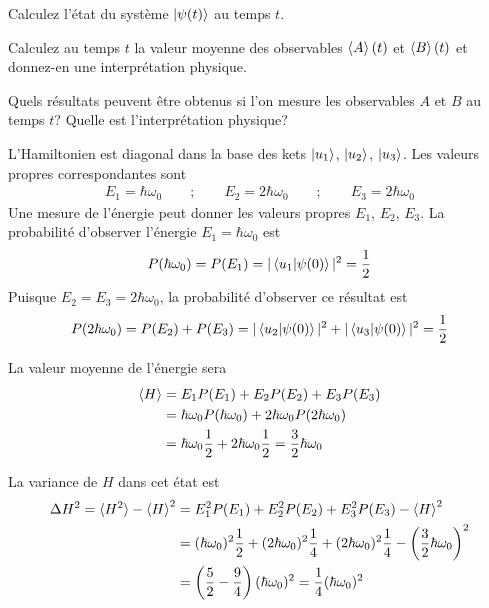 \documentclass[12pt,solution=false]{uqtrassignment}
\begin{document}
\begin{problem}{}
\subproblem
Calculez l'état du système $\ket{\psi(t)}$ au temps $t$.

\subproblem
Calculez au temps $t$ la valeur moyenne des observables
  $\braket{A}(t)$ et $\braket{B}(t)$
  et donnez-en une interprétation physique.



\subproblem
Quels résultats peuvent être obtenus si l'on mesure les observables
  $A$ et $B$ au temps $t$?
Quelle est l'interprétation physique?


\begin{solution}

\subproblem
L'Hamiltonien est diagonal dans la base des kets
  $\ket{u_1}$,  $\ket{u_2}$,  $\ket{u_3}$. 
Les valeurs propres correspondantes sont
\begin{align}
  E_1 = \hbar \omega_0
  \qquad ; \qquad
  E_2 = 2 \hbar \omega_0
  \qquad ; \qquad
  E_3 = 2 \hbar \omega_0
\end{align}
Une mesure de l'énergie peut donner les valeurs propres
  $E_1$, $E_2$, $E_3$.
%
La probabilité d'observer l'énergie $E_1=\hbar \omega_0$ est
\begin{align}
  P(\hbar\omega_0) = P(E_1) = \vert \braket{u_1 \vert \psi(0)} \vert^2 = \frac{1}{2}
\end{align}
Puisque $E_2=E_3=2\hbar\omega_0$, la probabilité d'observer ce résultat est
\begin{align}
  P(2\hbar\omega_0) = P(E_2) + P(E_3)
  = \vert \braket{u_2 \vert \psi(0)} \vert^2
  + \vert \braket{u_3 \vert \psi(0)} \vert^2
  = \frac{1}{2}
\end{align}

La valeur moyenne de l'énergie sera
\begin{align}
  \braket{H}
  &= E_1 P(E_1) + E_2 P(E_2) + E_3 P(E_3)
  \\
  &= \hbar\omega_0 P(\hbar\omega_0) + 2 \hbar\omega_0 P(2\hbar\omega_0)
  \\
  &= \hbar\omega_0 \frac{1}{2} + 2 \hbar\omega_0 \frac{1}{2}
  = \frac{3}{2} \hbar \omega_0
\end{align}

La variance de $H$ dans cet état est
\begin{align}
  \Delta H^2 = \braket{H^2} - \braket{H}^2
  &= E_1^2 P(E_1) + E_2^2 P(E_2) + E_3^2 P(E_3) - \braket{H}^2
  \\
  &= (\hbar\omega_0)^2 \frac{1}{2} + (2 \hbar\omega_0)^2 \frac{1}{4} + (2 \hbar\omega_0)^2 \frac{1}{4}
  - \left(\frac{3}{2} \hbar \omega_0\right)^2
  \\
  &= \left(\frac{5}{2} - \frac{9}{4}\right) (\hbar\omega_0)^2
  = \frac{1}{4} (\hbar\omega_0)^2
\end{align}


\end{solution}
\end{problem}
\end{document}
